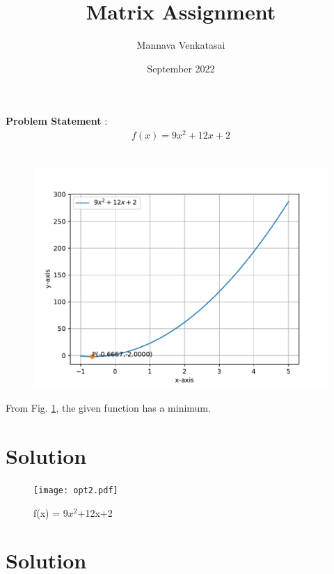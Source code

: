 \documentclass[journal,10pt,twocolumn]{article}
\title{\textbf{Matrix Assignment}}
\author{Mannava Venkatasai}
\date{September 2022}
\begin{document}
\maketitle
\raggedright \textbf{Problem Statement} :\vspace{3mm} \\ 
\fi
\begin{align}
f(x) = 9x^2+12x+2 
\end{align}
\\
\solution
	\begin{figure}[!ht]
		\centering
		\includegraphics[width=\columnwidth]{12/6/5/1/1/figs/opt2.pdf}
		\caption{}
		\label{fig:12/6/5/1/1}
  	\end{figure}
	From Fig.
		\ref{fig:12/6/5/1/1}, the given function has a minimum.
\iffalse
\section*{Solution}
\begin{figure}[h]
\centering
\texttt{[image: opt2.pdf]}
	\caption{f(x) = 9$x^2$+12x+2}
\label{fig:Curve}
\end{figure}
\section*{Solution}
\end{document}
